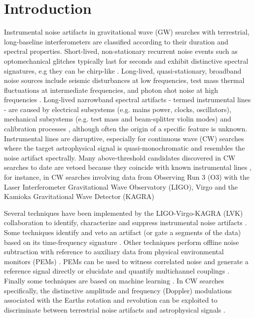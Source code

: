 \documentclass[pra,superscriptaddress,reprint,amsmath,amssymb,nofootinbib]{revtex4-2}
\begin{document}
\section{Introduction} \label{sec:intro}
Instrumental noise artifacts in gravitational wave (GW) searches with terrestrial, long-baseline interferometers are classified according to their duration and spectral properties.  Short-lived, non-stationary recurrent noise events such as optomechanical glitches typically last for seconds and exhibit distinctive spectral signatures, e.g they can be chirp-like \cite{Blackburn2008,Aasi2012,Aasi2015,DetCharGW150914:2016,Glanzer2023}. Long-lived, quasi-stationary, broadband noise sources include seismic disturbances at low frequencies, test mass thermal fluctuations at intermediate frequencies, and photon shot noise at high frequencies \cite{AasiEtAlAdLIGO:2015,LIGOnoiseguide,VIROGnoise,Akutsu2021PTEP,Nguyen2021}. Long-lived narrowband spectral artifacts - termed instrumental lines - are caused by electrical subsystems (e.g. mains power, clocks, oscillators), mechanical subsystems (e.g. test mass and beam-splitter violin modes) and calibration processes \cite{CovasEtAl:2018}, although often the origin of a specific feature is unknown. Instrumental lines are disruptive, especially for continuous wave (CW) searches where the target astrophysical signal is quasi-monochromatic and resembles the noise artifact spectrally. Many above-threshold candidates discovered in CW searches to date are vetoed because they coincide with known instrumental lines \cite{Piccinni2022,Riles2023,Wette2023}, for instance, in CW searches involving data from Observing Run 3 (O3) with the Laser Interferometer Gravitational Wave Observatory (LIGO), Virgo and the Kamioka Gravitational Wave Detector (KAGRA)  \cite[e.g.][]{Ligo_lineveto1,ligo_lineveto2,ligo_lineveto3} \newline 


Several techniques have been implemented by the LIGO-Virgo-KAGRA (LVK) collaboration to identify, characterize and suppress instrumental noise artifacts \cite{Davis2021,Davisgalaxies10010012}. Some techniques identify and veto an artifact (or gate a segments of the data) based on its time-frequency signature \cite{Abbott2018CQVeto,Lee2021,Steltner2022Ph}. Other techniques perform offline noise subtraction with reference to auxiliary data from physical environmental monitors (PEMs) \cite{Driggers2012RScI,Tiwari2015,Davis2019,Driggers2019}. PEMs can be used to witness correlated noise and generate a reference signal directly or elucidate and quantify multichannel couplings \cite{Jung2022PRD,marin1997}. Finally some techniques are based on machine learning \cite{Cuoco2020,Vajente2020PhR,OrmistonEtAl:2020,Yamamoto2023}. In CW searches specifically, the distinctive amplitude and frequency (Doppler) modulations associated with the Earths rotation and revolution can be exploited to discriminate between terrestrial noise artifacts and astrophysical signals \cite{Zhu2017PhRvD,JonesPhysRevD.106.123011}.  \newline 
\end{document}
